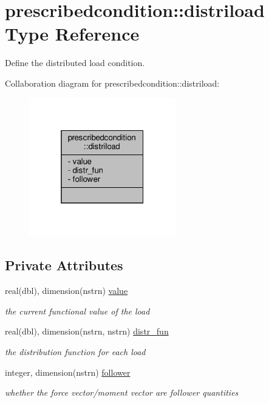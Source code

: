 \hypertarget{structprescribedcondition_1_1distriload}{}\section{prescribedcondition\+:\+:distriload Type Reference}
\label{structprescribedcondition_1_1distriload}


Define the distributed load condition.  




Collaboration diagram for prescribedcondition\+:\+:distriload\+:\nopagebreak
\begin{figure}[H]
\begin{center}
\leavevmode
\includegraphics[width=181pt]{structprescribedcondition_1_1distriload__coll__graph}
\end{center}
\end{figure}
\subsection*{Private Attributes}
\begin{DoxyCompactItemize}
\item 
real(dbl), dimension(nstrn) \hyperlink{structprescribedcondition_1_1distriload_a32fb9fe519f0164a70313c8e7627976b}{value}
\begin{DoxyCompactList}\small\item\em the current functional value of the load \end{DoxyCompactList}\item 
real(dbl), dimension(nstrn, nstrn) \hyperlink{structprescribedcondition_1_1distriload_ac5734eaac28c08f44fd4f41857df75b2}{distr\+\_\+fun}
\begin{DoxyCompactList}\small\item\em the distribution function for each load \end{DoxyCompactList}\item 
integer, dimension(nstrn) \hyperlink{structprescribedcondition_1_1distriload_a476acfacfaac7a9d8ebaf6ce371279ff}{follower}
\begin{DoxyCompactList}\small\item\em whether the force vector/moment vector are follower quantities \end{DoxyCompactList}\end{DoxyCompactItemize}


